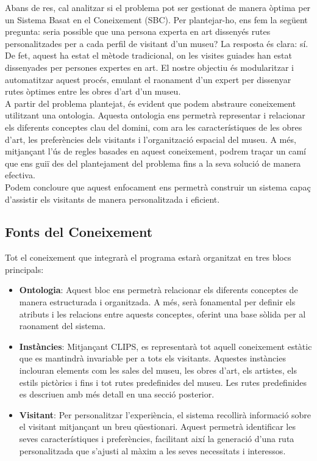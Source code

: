 \documentclass[a4paper]{article}
\begin{document}
	Abans de res, cal analitzar si el problema pot ser gestionat de manera òptima per un Sistema Basat en el Coneixement (SBC). Per plantejar-ho, ens fem la següent pregunta: seria possible que una persona experta en art dissenyés rutes personalitzades per a cada perfil de visitant d’un museu? La resposta és clara: sí. De fet, aquest ha estat el mètode tradicional, on les visites guiades han estat dissenyades per persones expertes en art. El nostre objectiu és modularitzar i automatitzar aquest procés, emulant el raonament d’un expert per dissenyar rutes òptimes entre les obres d’art d’un museu. \\
	
	A partir del problema plantejat, és evident que podem abstraure coneixement utilitzant una ontologia. Aquesta ontologia ens permetrà representar i relacionar els diferents conceptes clau del domini, com ara les característiques de les obres d’art, les preferències dels visitants i l’organització espacial del museu. A més, mitjançant l’ús de regles basades en aquest coneixement, podrem traçar un camí que ens guiï des del plantejament del problema fins a la seva solució de manera efectiva. \\
	
	Podem concloure que aquest enfocament ens permetrà construir un sistema capaç d’assistir els visitants de manera personalitzada i eficient.
	
	\subsection{Fonts del Coneixement}
	
	Tot el coneixement que integrarà el programa estarà organitzat en tres blocs principals:  
	\begin{itemize}  
		\item \textbf{Ontologia}: Aquest bloc ens permetrà relacionar els diferents conceptes de manera estructurada i organitzada. A més, serà fonamental per definir els atributs i les relacions entre aquests conceptes, oferint una base sòlida per al raonament del sistema.  
		
		\item \textbf{Instàncies}: Mitjançant CLIPS, es representarà tot aquell coneixement estàtic que es mantindrà invariable per a tots els visitants. Aquestes instàncies inclouran elements com les sales del museu, les obres d'art, els artistes, els estils pictòrics i fins i tot rutes predefinides del museu. Les rutes predefinides es descriuen amb més detall en una secció posterior.  
		
		\item \textbf{Visitant}: Per personalitzar l’experiència, el sistema recollirà informació sobre el visitant mitjançant un breu qüestionari. Aquest permetrà identificar les seves característiques i preferències, facilitant així la generació d’una ruta personalitzada que s’ajusti al màxim a les seves necessitats i interessos.  
	\end{itemize}
	
\end{document}
